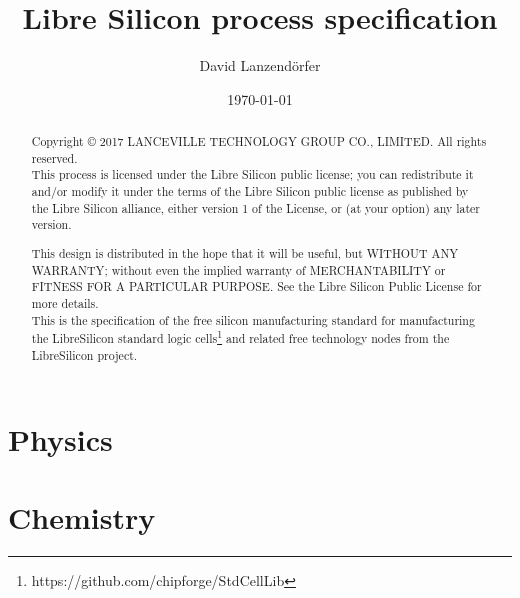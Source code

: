 \documentclass[10pt,a4paper,oneside]{article}
\title{Libre Silicon process specification}
\date{\today}
\author{David Lanzendörfer}
\begin{document}
\maketitle

\begin{abstract}
	Copyright © 2017 LANCEVILLE TECHNOLOGY GROUP CO., LIMITED. All rights reserved. \\

	This process is licensed under the Libre Silicon public license; you can redistribute it and/or modify it under the terms of the Libre Silicon public license
	as published by the Libre Silicon alliance, either version 1 of the License, or (at your option) any later version.

	This design is distributed in the hope that it will be useful, but WITHOUT ANY WARRANTY; without even the implied warranty of MERCHANTABILITY or FITNESS FOR A PARTICULAR PURPOSE.
	See the Libre Silicon Public License for more details. \\

	This is the specification of the free silicon manufacturing standard for manufacturing the LibreSilicon standard logic cells\footnote{https://github.com/chipforge/StdCellLib} and related free technology nodes from the LibreSilicon project.
\end{abstract}

\newpage
\tableofcontents
\newpage

\newpage
\section{Physics}

\newpage
\section{Chemistry}

\newpage

\newpage

\newpage

\newpage

\newpage

\newpage

\newpage

\end{document}
